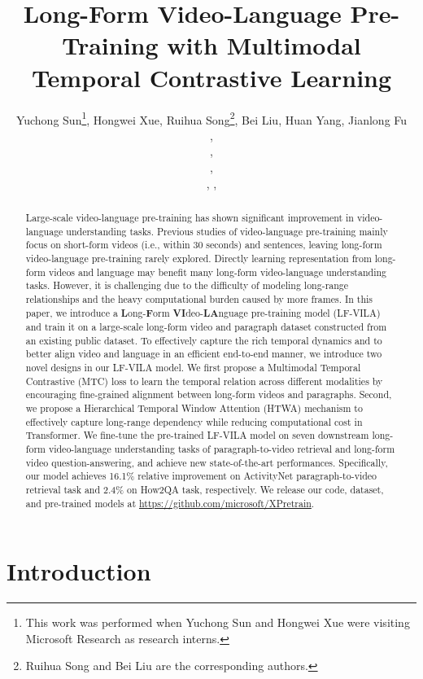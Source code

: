 \documentclass{article}
\title{Long-Form Video-Language Pre-Training with Multimodal Temporal Contrastive Learning}
\author{Yuchong Sun\affmark[1]\thanks{This work was performed when Yuchong Sun and Hongwei Xue were visiting Microsoft Research as research interns.}, Hongwei Xue\affmark[2]\samethanks[1], Ruihua Song\affmark[1]\thanks{Ruihua Song and Bei Liu are the corresponding authors.}, Bei Liu\affmark[3]\samethanks[2], Huan Yang\affmark[3], Jianlong Fu\affmark[3]\\
\normalsize
\affaddr{\affmark[1]Renmin University of China, Beijing, China}, \\
\affaddr{\affmark[2]University of Science and Technology of China, Hefei, China},\\
\affaddr{\affmark[3]Microsoft Research, Beijing, China},\\
\normalsize
\affmark[1]{\tt \{ycsun, rsong\}@ruc.edu.cn}, 
\affmark[2]{\tt gh051120@mail.ustc.edu.cn}, \\
\affmark[3]{\tt \{bei.liu, huayan, jianf\}@microsoft.com}
}
\begin{document}
\maketitle


\begin{abstract}
Large-scale video-language pre-training has shown significant improvement in video-language understanding tasks.
Previous studies of video-language pre-training mainly focus on short-form videos (i.e., within 30 seconds) and sentences, leaving long-form video-language pre-training rarely explored. 
Directly learning representation from long-form videos and language may benefit many long-form video-language understanding tasks. However, it is challenging due to the difficulty of modeling long-range relationships and the heavy computational burden caused by more frames.
In this paper, we introduce a \textbf{L}ong-\textbf{F}orm \textbf{VI}deo-\textbf{LA}nguage pre-training model (LF-VILA) and train it on a large-scale long-form video and paragraph dataset constructed from an existing public dataset. 
To effectively capture the rich temporal dynamics and to better align video and language in an efficient end-to-end manner, we introduce two novel designs in our LF-VILA model.
We first propose a Multimodal Temporal Contrastive (MTC) loss to learn the temporal relation across different modalities by encouraging fine-grained alignment between long-form videos and paragraphs.
Second, we propose a Hierarchical Temporal Window Attention (HTWA) mechanism to effectively capture long-range dependency while reducing computational cost in Transformer.
We fine-tune the pre-trained LF-VILA model on seven downstream long-form video-language understanding tasks of paragraph-to-video retrieval and long-form video question-answering, and achieve new state-of-the-art performances.
Specifically, our model achieves 16.1\%  relative improvement on ActivityNet paragraph-to-video retrieval task and 2.4\% on How2QA task, respectively. We release our code, dataset, and pre-trained models at \url{https://github.com/microsoft/XPretrain}.

\end{abstract} \section{Introduction}
\label{intro}
\end{document}
